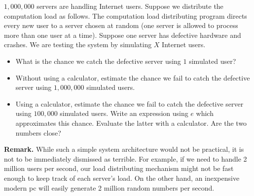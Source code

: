 $1,000,000$ servers are handling Internet users. Suppose we distribute the computation load as follows. The computation load distributing program directs every new user to a server chosen at random (one server is allowed to process more than one user at a time). Suppose one server has defective hardware and crashes. We are testing the system by simulating $X$ Internet users.
\begin{itemize}
\item What is the chance we catch the defective server using $1$ simulated user?
\item Without using a calculator, estimate the chance we fail to catch the defective server using $1,000,000$ simulated users.
\item Using a calculator, estimate the chance we fail to catch the defective server using $100,000$ simulated users. Write an expression using $e$ which approximates this chance. Evaluate the latter with a calculator. Are the two numbers close? 
\end{itemize}

\textbf{Remark.} While such a simple system architecture would not be practical, it is not to be immediately dismissed as terrible. For example, if we need to handle 2 million users per second, our load distributing mechanism might not be fast enough to keep track of each server's load. On the other hand, an inexpensive modern pc will easily generate 2 million random numbers per second.
